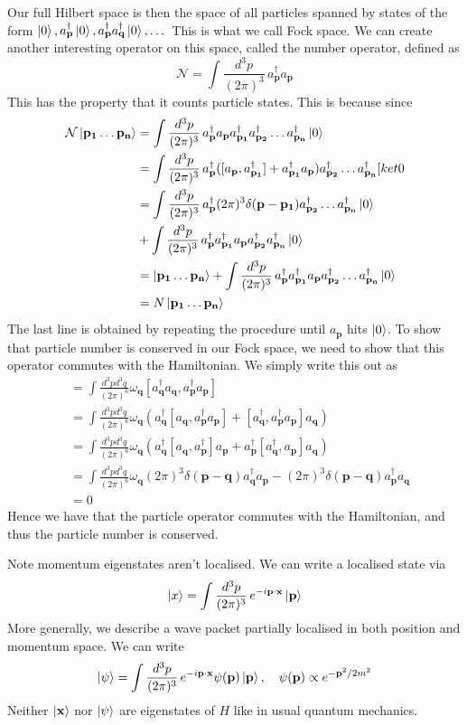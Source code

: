 \documentclass[11pt, oneside]{article}   	%
\theoremstyle{newline}
\theoremstyle{newline}
\theoremstyle{newline}
\theoremstyle{newline}
\theoremstyle{newline}
\newcommand{\intp}{ \int \frac{ d^3 p }{ (2 \pi)^3 } \, }
\newcommand{\ann}[1]{a_{ \mathbf{ #1 }}}
\newcommand{\crea}[1]{a^\dagger_{ \mathbf{ #1 }}}
\newcommand{\ve}[1]{ \mathbf{ #1 } }
\newcommand{\nmode}[1]{ e^{  - i \mathbf{ #1 } \cdot \mathbf{x} }}
\newcommand{\freq}[1]{\omega_\mathbf{ #1} }
\begin{document}
Our full Hilbert space is then the space of all particles spanned by states of the form $\ket{ 0 }, \crea{p} \ket{ 0 }, \crea{ p } \crea{ q} \ket{ 0 }, \dots $ This is what we call Fock space. We can create another interesting operator on this space, called the number operator, defined as
\[ 
\mathcal{ N }  = \intp \crea{ p} \ann{ p} 
\] This has the property that it counts particle states. This is because since 
\begin{align*} 
\mathcal { N } \ket{ \ve{p_1} \dots \ve{p_n} }  & = \intp \crea{ p} \ann{p} \crea{p_1} \crea{p_2} \dots \crea{ p_n } \ket{ 0} \\
&= \intp \crea{ p} ( [ \ann{ p} , \crea{p_1} ] + \crea{p_1} \ann{ p} ) \crea{p_2} \dots \crea{p_n} [ket{ 0} \\
&= \intp \crea{ p} ( 2\pi )^3 \delta ( \ve{ p - p_1} ) \crea{p_2} \dots \crea{p_n} \ket{0} \\
& + \intp \crea{ p} \crea{ p_1} \ann{p}  \crea{p_2} \crea{p_n} \ket{ 0} \\
&= \ket{ \ve{p_1} \dots \ve{p_n} } + \intp \crea{ p} \crea{ p_1} \ann{p } \crea{ p_2} \dots \crea{ p_n} \ket{ 0 } \\
&= N \ket{ \ve{p_1} \dots \ve{p_n} } 
\end{align*} 
The last line is obtained by repeating the procedure until $\ann{p }$ hits $\ket{ 0}$. 
To show that particle number is conserved in our Fock space, we need to show that this operator commutes with the Hamiltonian. We simply write this out as 
\begin{align*} 
[ H , \mathcal{ N } ] &= \int \frac{ d^3 p d^3 q }{ ( 2 \pi )^6} \freq{q} [ \crea{ q} \ann{q} , \crea{ p} \ann{ p} ] \\
	&=  \int \frac{ d^3 p d^3 q }{ ( 2 \pi )^6} \freq{q} \left( \crea{ q} [ \ann{q}, \crea{ p} \ann{ p} ] + [ \crea{ q}, \crea{ p} \ann{ p } ] \ann{ q} \right)  \\
	&= \int \frac{ d^3 p d^3 q }{ ( 2 \pi )^6} \freq{q} \left( \crea{ q} [ \ann{ q}, \crea{ p } ] \ann{ p} + \crea{ p} [ \crea{ q} , \ann{p} ] \ann{ q}  \right)  \\
&= \int \frac{ d^3 p d^3 q }{ ( 2 \pi )^6} \freq{q} (2 \pi )^3 \delta ( \ve{ p - q} ) \crea{ q} \ann{ p } - (2 \pi )^3 \delta ( \ve{ p - q} ) \crea{ p} \ann{ q} \\
& = 0 
\end{align*} 
Hence we have that the particle operator commutes with the Hamiltonian, and thus the particle number is conserved. 

Note momentum eigenstates aren't localised. We can write a localised state via 
\[ 
\ket{ x} = \intp \nmode{p }  \ket{ \ve{ p} } 
\] More generally, we describe a wave packet partially localised in both position and momentum space. We can write 
\[
\ket{ \psi }  = \intp \nmode{ p } \psi ( \ve { p } ) \ket{ \ve{ p } } , \quad \psi ( \ve { p } ) \propto e^{  - \ve{ p }^2 / 2m^  2 }
\] Neither $\ket { \ve { x} } $ nor  $ \ket { \psi } $ are eigenstates of $H$ like in usual quantum mechanics. 
\end{document}
